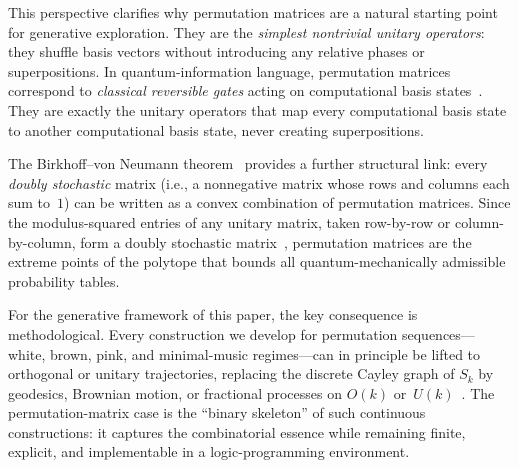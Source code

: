 \documentclass[
  twocolumn,
  aps,
  pra,
  showkeys,
  amsmath,amssymb,
  longbibliography
]{revtex4-2}
\begin{document}
This perspective clarifies why permutation matrices are a
natural starting point for generative exploration.
They are the \emph{simplest nontrivial unitary operators}:
they shuffle basis vectors without introducing any relative
phases or superpositions.
In quantum-information language, permutation matrices
correspond to \emph{classical reversible gates} acting on
computational basis states~\cite{nielsen-chuang-00}.
They are exactly the unitary operators that map every
computational basis state to another computational basis
state, never creating superpositions.

The Birkhoff--von Neumann theorem~\cite{birkhoff-46}
provides a further structural link: every \emph{doubly
stochastic} matrix (i.e., a nonnegative matrix whose rows and
columns each sum to~$1$) can be written as a convex
combination of permutation matrices.
Since the modulus-squared entries of any unitary matrix, taken
row-by-row or column-by-column, form a doubly stochastic
matrix~\cite{schur-23,horn-54}, permutation matrices are the
extreme points of the polytope that bounds all
quantum-mechanically admissible probability tables.

For the generative framework of this paper, the key
consequence is methodological.
Every construction we develop for permutation
sequences---white, brown, pink, and minimal-music
regimes---can in principle be lifted to orthogonal or unitary
trajectories, replacing the discrete Cayley graph of $S_k$ by
geodesics, Brownian motion, or fractional processes on $O(k)$
or~$U(k)$~\cite{liao-04}.
The permutation-matrix case is the ``binary skeleton'' of such
continuous constructions: it captures the combinatorial
essence while remaining finite, explicit, and implementable in
a logic-programming environment.
\end{document}
